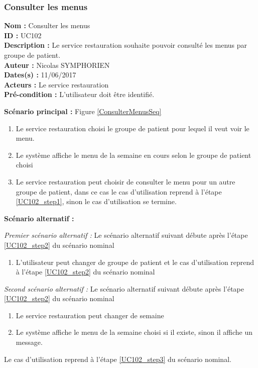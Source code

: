 \subsubsection{Consulter les menus}

\noindent\textbf{Nom :} Consulter les menus \\
\textbf{ID :} UC102 \\
\textbf{Description :} Le service restauration souhaite pouvoir consulté les menus par groupe de patient. \\
\textbf{Auteur :} Nicolas SYMPHORIEN \\
\textbf{Dates(s) :} 11/06/2017 \\
\textbf{Acteurs :} Le service restauration \\
\textbf{Pré-condition :} L'utilisateur doit être identifié.

\noindent \textbf{Scénario principal :} Figure \ref{ConsulterMenusSeq}

\begin{enumerate}
	\item \label{UC102_step1}Le service restauration choisi le groupe de patient pour lequel il veut voir le menu.
	\item \label{UC102_step2}Le système affiche le menu de la semaine en cours selon le groupe de patient choisi
	\item \label{UC102_step3}Le service restauration peut choisir de consulter le menu pour un autre groupe de patient, dans ce cas le cas d'utilisation reprend à l'étape \ref{UC102_step1}, sinon le cas d'utilisation se termine.
\end{enumerate}

\noindent \textbf{Scénario alternatif :}

\textit{Premier scénario alternatif :}
Le scénario alternatif suivant débute après l'étape \ref{UC102_step2} du scénario nominal
\begin{enumerate}
	\item L'utilisateur peut changer de groupe de patient et le cas d'utilisation reprend à l'étape \ref{UC102_step2} du scénario nominal
\end{enumerate}

\textit{Second scénario alternatif :}
Le scénario alternatif suivant débute après l'étape \ref{UC102_step2} du scénario nominal
\begin{enumerate}
	\item Le service restauration peut changer de semaine
	\item Le système affiche le menu de la semaine choisi si il existe, sinon il affiche un message. 
\end{enumerate}
Le cas d'utilisation reprend à l'étape \ref{UC102_step3} du scénario nominal.

